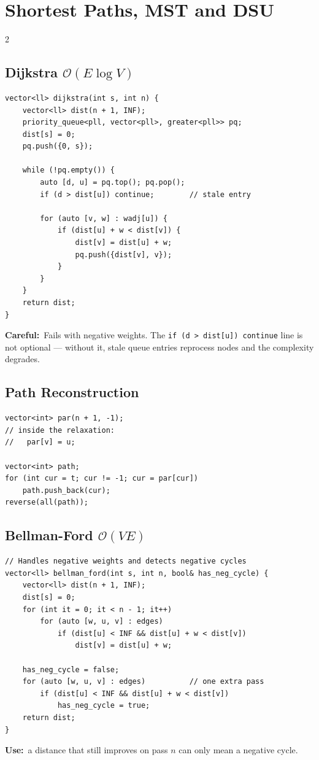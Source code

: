\documentclass[10pt]{article}
\newcommand{\code}[1]{\texttt{\small #1}}
\newcommand{\sub}[2]{\subsection[#1]{#1\hspace{0.6em}%
  \textnormal{\color{accent2}\small$\mathcal{O}(#2)$}}}
\newcommand{\uses}[1]{{\color{accent2}\footnotesize\textbf{Use:}}~{\footnotesize #1}\par}
\newcommand{\warn}[1]{{\color{warnc}\footnotesize\textbf{Careful:}}~{\footnotesize #1}\par}
\begin{document}
\section{Shortest Paths, MST and DSU}
\begin{multicols}{2}

\sub{Dijkstra}{E \log V}
\begin{lstlisting}
vector<ll> dijkstra(int s, int n) {
    vector<ll> dist(n + 1, INF);
    priority_queue<pll, vector<pll>, greater<pll>> pq;
    dist[s] = 0;
    pq.push({0, s});

    while (!pq.empty()) {
        auto [d, u] = pq.top(); pq.pop();
        if (d > dist[u]) continue;        // stale entry

        for (auto [v, w] : wadj[u]) {
            if (dist[u] + w < dist[v]) {
                dist[v] = dist[u] + w;
                pq.push({dist[v], v});
            }
        }
    }
    return dist;
}
\end{lstlisting}
\warn{Fails with negative weights. The \code{if (d > dist[u]) continue}
line is not optional --- without it, stale queue entries reprocess
nodes and the complexity degrades.}

\subsection{Path Reconstruction}
\begin{lstlisting}
vector<int> par(n + 1, -1);
// inside the relaxation:
//   par[v] = u;

vector<int> path;
for (int cur = t; cur != -1; cur = par[cur])
    path.push_back(cur);
reverse(all(path));
\end{lstlisting}

\sub{Bellman-Ford}{VE}
\begin{lstlisting}
// Handles negative weights and detects negative cycles
vector<ll> bellman_ford(int s, int n, bool& has_neg_cycle) {
    vector<ll> dist(n + 1, INF);
    dist[s] = 0;
    for (int it = 0; it < n - 1; it++)
        for (auto [w, u, v] : edges)
            if (dist[u] < INF && dist[u] + w < dist[v])
                dist[v] = dist[u] + w;

    has_neg_cycle = false;
    for (auto [w, u, v] : edges)          // one extra pass
        if (dist[u] < INF && dist[u] + w < dist[v])
            has_neg_cycle = true;
    return dist;
}
\end{lstlisting}
\uses{a distance that still improves on pass $n$ can only mean a
negative cycle.}


\end{multicols}
\end{document}
